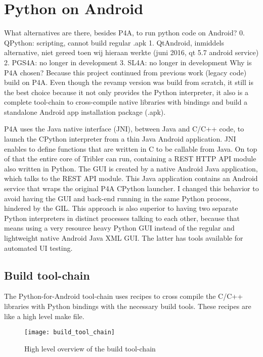 \section{Python on Android}
What alternatives are there, besides P4A, to run python code on Android?
0. QPython: scripting, cannot build regular .apk
1. QtAndroid, inmiddels alternative, niet gereed toen wij hieraan werkte (juni 2016, qt 5.7 android service)
2. PGS4A: no longer in development
3. SL4A: no longer in development
Why is P4A chosen?
Because this project continued from previous work (legacy code) build on P4A.
Even though the revamp version was build from scratch, it still is the best choice because it not only provides the Python interpreter, it also is a complete tool-chain to cross-compile native libraries with bindings and build a standalone Android app installation package (.apk).


P4A uses the Java native interface (JNI), between Java and C/C++ code, to launch the CPython interpreter from a thin Java Android application.
JNI enables to define functions that are written in C to be callable from Java.
On top of that the entire core of Tribler can run, containing a REST HTTP API module also written in Python.
The GUI is created by a native Android Java application, which talks to the REST API module.
This Java application contains an Android service that wraps the original P4A CPython launcher.
I changed this behavior to avoid having the GUI and back-end running in the same Python process, hindered by the GIL.
This approach is also superior to having two separate Python interpreters in distinct processes talking to each other, because that means using a very resource heavy Python GUI instead of the regular and lightweight native Android Java XML GUI.
The latter has tools available for automated UI testing.


\subsection{Build tool-chain}
The Python-for-Android tool-chain uses recipes to cross compile the C/C++ libraries with Python bindings with the necessary build tools.
These recipes are like a high level make file.

\begin{figure}[H]
	\centering
	\texttt{[image: build\_tool\_chain]}
	\caption{High level overview of the build tool-chain}
	\label{fig:build_tool_chain}
\end{figure}


